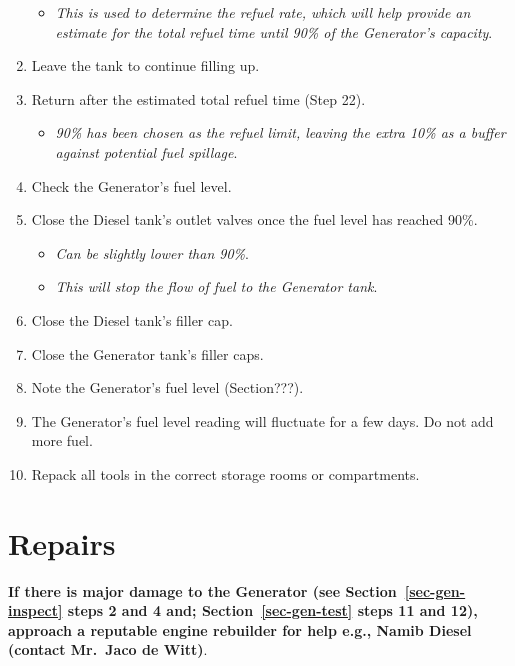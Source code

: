 \documentclass[
  letterpaper,
  DIV=11,
  numbers=noendperiod]{scrreprt}
\providecommand{\tightlist}{%
  \setlength{\itemsep}{0pt}\setlength{\parskip}{0pt}}\usepackage{longtable,booktabs,array}
\begin{document}
\begin{enumerate}
  \begin{itemize}
  \tightlist
  \item
    \emph{This is used to determine the refuel rate, which will help
    provide an estimate for the total refuel time until 90\% of the
    Generator's capacity}.
  \end{itemize}
\item
  Leave the tank to continue filling up.
\item
  Return after the estimated total refuel time (Step 22).

  \begin{itemize}
  \tightlist
  \item
    \emph{90\% has been chosen as the refuel limit, leaving the extra
    10\% as a buffer against potential fuel spillage}.
  \end{itemize}
\item
  Check the Generator's fuel level.
\item
  Close the Diesel tank's outlet valves once the fuel level has reached
  90\%.

  \begin{itemize}
  \tightlist
  \item
    \emph{Can be slightly lower than 90\%}.
  \item
    \emph{This will stop the flow of fuel to the Generator tank}.
  \end{itemize}
\item
  Close the Diesel tank's filler cap.
\item
  Close the Generator tank's filler caps.
\item
  Note the Generator's fuel level (Section???).
\item
  The Generator's fuel level reading will fluctuate for a few days. Do
  not add more fuel.
\item
  Repack all tools in the correct storage rooms or compartments.
\end{enumerate}

\hypertarget{repairs-2}{%
\section{Repairs}\label{repairs-2}}

\textbf{If there is major damage to the Generator (see
Section~\ref{sec-gen-inspect} steps 2 and 4 and;
Section~\ref{sec-gen-test} steps 11 and 12), approach a reputable engine
rebuilder for help e.g., Namib Diesel (contact Mr.~Jaco de Witt)}.
\end{document}
